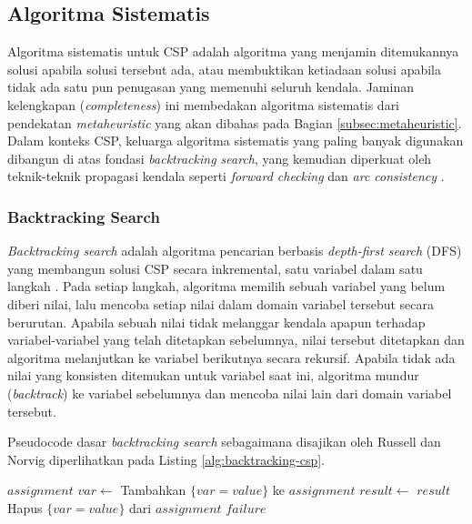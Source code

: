 \subsection{Algoritma Sistematis}
\label{subsec:algoritma-sistematis}

Algoritma sistematis untuk CSP adalah algoritma yang menjamin ditemukannya solusi apabila solusi tersebut ada, atau membuktikan ketiadaan solusi apabila tidak ada satu pun penugasan yang memenuhi seluruh kendala. Jaminan kelengkapan (\textit{completeness}) ini membedakan algoritma sistematis dari pendekatan \textit{metaheuristic} yang akan dibahas pada Bagian \ref{subsec:metaheuristic}. Dalam konteks CSP, keluarga algoritma sistematis yang paling banyak digunakan dibangun di atas fondasi \textit{backtracking search}, yang kemudian diperkuat oleh teknik-teknik propagasi kendala seperti \textit{forward checking} dan \textit{arc consistency} \cite{russell2020artificial}.

\subsubsection{Backtracking Search}
\label{subsubsec:backtracking}

\textit{Backtracking search} adalah algoritma pencarian berbasis \textit{depth-first search} (DFS) yang membangun solusi CSP secara inkremental, satu variabel dalam satu langkah \cite{russell2020artificial}. Pada setiap langkah, algoritma memilih sebuah variabel yang belum diberi nilai, lalu mencoba setiap nilai dalam domain variabel tersebut secara berurutan. Apabila sebuah nilai tidak melanggar kendala apapun terhadap variabel-variabel yang telah ditetapkan sebelumnya, nilai tersebut ditetapkan dan algoritma melanjutkan ke variabel berikutnya secara rekursif. Apabila tidak ada nilai yang konsisten ditemukan untuk variabel saat ini, algoritma mundur (\textit{backtrack}) ke variabel sebelumnya dan mencoba nilai lain dari domain variabel tersebut.

Pseudocode dasar \textit{backtracking search} sebagaimana disajikan oleh Russell dan Norvig \cite{russell2020artificial} diperlihatkan pada Listing \ref{alg:backtracking-csp}.

\begin{algorithm}[H]
	\caption{Backtracking Search untuk CSP}
	\label{alg:backtracking-csp}
	\begin{algorithmic}[1]
		\State \Return $assignment$
		\EndIf
		\State $var \gets$ 
		\State Tambahkan $\{var = value\}$ ke $assignment$
		\State $result \gets$ 
		\State \Return $result$
		\EndIf
		\State Hapus $\{var = value\}$ dari $assignment$
		\EndIf
		\EndFor
		\State \Return $failure$
		\EndFunction
	\end{algorithmic}
\end{algorithm}

